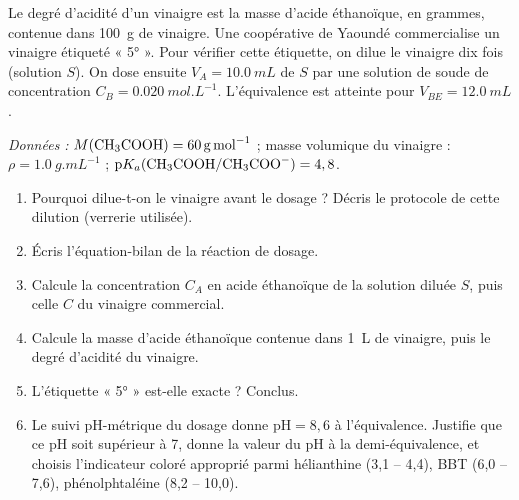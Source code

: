 \documentclass[11pt]{article}
\newcommand{\cle}[1]{{\popxbold\color{popdark}#1}}
\begin{document}
\begin{exercice}
Le \cle{degré d'acidité} d'un vinaigre est la masse d'acide éthanoïque, en grammes, contenue dans \SI{100}{g} de vinaigre. Une coopérative de Yaoundé commercialise un vinaigre étiqueté « 5° ». Pour vérifier cette étiquette, on dilue le vinaigre dix fois (solution $S$). On dose ensuite $V_A = \SI{10,0}{mL}$ de $S$ par une solution de soude de concentration $C_B = \SI{0,020}{mol.L^{-1}}$. L'équivalence est atteinte pour $V_{BE} = \SI{12,0}{mL}$.

\emph{Données :} $M(\ce{CH3COOH}) = \SI{60}{g.mol^{-1}}$ ; masse volumique du vinaigre : $\rho = \SI{1,0}{g.mL^{-1}}$ ; $\mathrm{p}K_a(\ce{CH3COOH}/\ce{CH3COO-}) = 4,8$.
\begin{enumerate}
\item Pourquoi dilue-t-on le vinaigre avant le dosage ? Décris le protocole de cette dilution (verrerie utilisée).
\item Écris l'équation-bilan de la réaction de dosage.
\item Calcule la concentration $C_A$ en acide éthanoïque de la solution diluée $S$, puis celle $C$ du vinaigre commercial.
\item Calcule la masse d'acide éthanoïque contenue dans \SI{1}{L} de vinaigre, puis le degré d'acidité du vinaigre.
\item L'étiquette « 5° » est-elle exacte ? Conclus.
\item Le suivi pH-métrique du dosage donne $\mathrm{pH} = 8,6$ à l'équivalence. Justifie que ce pH soit supérieur à 7, donne la valeur du pH à la demi-équivalence, et choisis l'indicateur coloré approprié parmi hélianthine (3,1 -- 4,4), BBT (6,0 -- 7,6), phénolphtaléine (8,2 -- 10,0).
\end{enumerate}
\end{exercice}
\end{document}
